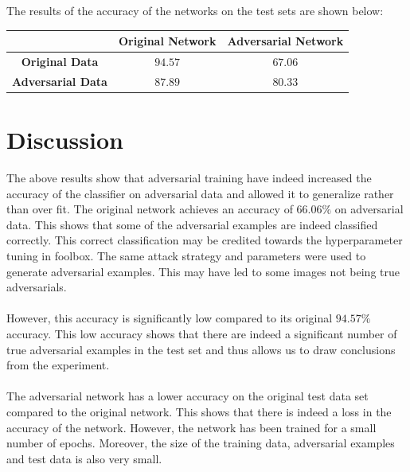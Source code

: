 \documentclass[11pt]{article}
\begin{document}
The results of the accuracy of the networks on the test sets are shown below:
\begin{table}[H]
	\begin{center}
		\begin{tabular}{||c c c||}
		\hline
		& \textbf{Original Network} & \textbf{Adversarial Network}\\
		\hline
		\textbf{Original Data} & $94.57$ & $67.06$\\
		\hline
		\textbf{Adversarial Data} & $87.89$ & $80.33$\\
		\hline
		\end{tabular}
	\end{center}
\end{table}




\section{Discussion}

The above results show that adversarial training have indeed increased the accuracy of the classifier on adversarial data and allowed it to generalize rather than over fit. The original network achieves an accuracy of $66.06 \%$  on adversarial data. This shows that some of the adversarial examples are indeed classified correctly. This correct classification may be credited towards the hyperparameter tuning in foolbox. The same attack strategy and parameters were used to generate adversarial examples. This may have led to some images not being true adversarials.\\ \\ 
However, this accuracy is significantly low compared to its original $94.57 \%$ accuracy. This low accuracy shows that there are indeed a significant number of true adversarial examples in the test set and thus allows us to draw conclusions from the experiment.\\ \\
The adversarial network has a lower accuracy on the original test data set compared to the original network. This shows that there is indeed a loss in the accuracy of the network. However, the network has been trained for a small number of epochs. Moreover, the size of the training data, adversarial examples and test data is also very small. 
\end{document}
